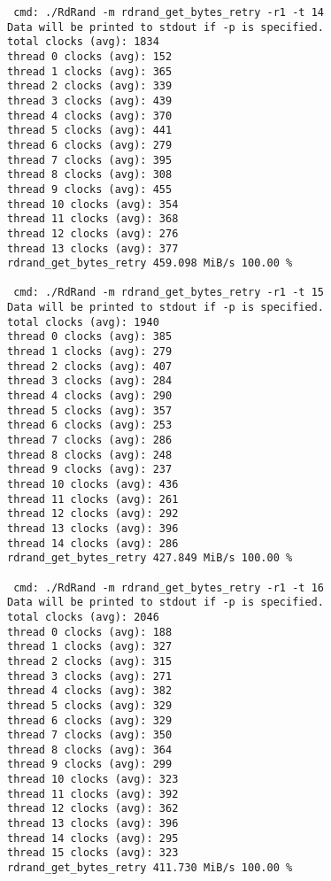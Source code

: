\begin{lstlisting}
 cmd: ./RdRand -m rdrand_get_bytes_retry -r1 -t 14
Data will be printed to stdout if -p is specified.
total clocks (avg): 1834
thread 0 clocks (avg): 152
thread 1 clocks (avg): 365
thread 2 clocks (avg): 339
thread 3 clocks (avg): 439
thread 4 clocks (avg): 370
thread 5 clocks (avg): 441
thread 6 clocks (avg): 279
thread 7 clocks (avg): 395
thread 8 clocks (avg): 308
thread 9 clocks (avg): 455
thread 10 clocks (avg): 354
thread 11 clocks (avg): 368
thread 12 clocks (avg): 276
thread 13 clocks (avg): 377
rdrand_get_bytes_retry 459.098 MiB/s 100.00 %

 cmd: ./RdRand -m rdrand_get_bytes_retry -r1 -t 15
Data will be printed to stdout if -p is specified.
total clocks (avg): 1940
thread 0 clocks (avg): 385
thread 1 clocks (avg): 279
thread 2 clocks (avg): 407
thread 3 clocks (avg): 284
thread 4 clocks (avg): 290
thread 5 clocks (avg): 357
thread 6 clocks (avg): 253
thread 7 clocks (avg): 286
thread 8 clocks (avg): 248
thread 9 clocks (avg): 237
thread 10 clocks (avg): 436
thread 11 clocks (avg): 261
thread 12 clocks (avg): 292
thread 13 clocks (avg): 396
thread 14 clocks (avg): 286
rdrand_get_bytes_retry 427.849 MiB/s 100.00 %

 cmd: ./RdRand -m rdrand_get_bytes_retry -r1 -t 16
Data will be printed to stdout if -p is specified.
total clocks (avg): 2046
thread 0 clocks (avg): 188
thread 1 clocks (avg): 327
thread 2 clocks (avg): 315
thread 3 clocks (avg): 271
thread 4 clocks (avg): 382
thread 5 clocks (avg): 329
thread 6 clocks (avg): 329
thread 7 clocks (avg): 350
thread 8 clocks (avg): 364
thread 9 clocks (avg): 299
thread 10 clocks (avg): 323
thread 11 clocks (avg): 392
thread 12 clocks (avg): 362
thread 13 clocks (avg): 396
thread 14 clocks (avg): 295
thread 15 clocks (avg): 323
rdrand_get_bytes_retry 411.730 MiB/s 100.00 %
\end{lstlisting}
